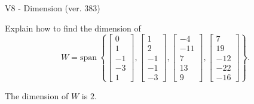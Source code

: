 \begin{exercise}
  \begin{exerciseTitle}V8 - Dimension (ver. 383)\end{exerciseTitle}
  \begin{exerciseStatement}
    Explain how to find the dimension of 
\[W=\mathrm{span}\ \left\{\left[\begin{array}{r}
0 \\
1 \\
-1 \\
-3 \\
1
\end{array}\right] , \left[\begin{array}{r}
1 \\
2 \\
-1 \\
-1 \\
-3
\end{array}\right] , \left[\begin{array}{r}
-4 \\
-11 \\
7 \\
13 \\
9
\end{array}\right] , \left[\begin{array}{r}
7 \\
19 \\
-12 \\
-22 \\
-16
\end{array}\right]\right\}.\]



  \end{exerciseStatement}
  \begin{exerciseAnswer}
   The dimension of \(W\) is  \(2\).
  


  \end{exerciseAnswer}
\end{exercise}